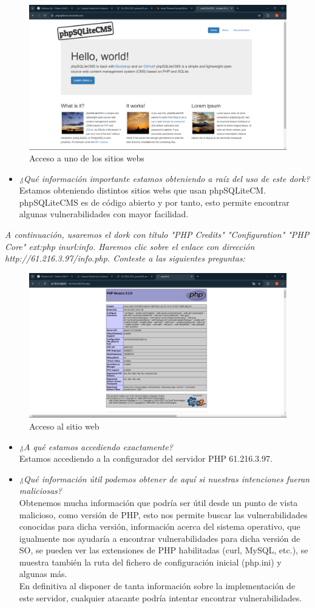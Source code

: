 \documentclass[12pt]{book}
\begin{document}
\begin{figure}[h]
    \centering
    \includegraphics[width=0.5\linewidth]{Practica 3y4/images/Captura de pantalla (83).png}
    \caption{Acceso a uno de los sitios webs}
    \label{fig:enter-label}
\end{figure}
\begin{itemize}
    \item\textit{¿Qué información importante estamos obteniendo a raíz del uso de este dork?}
    Estamos obteniendo distintos sitios webs que usan phpSQLiteCM. phpSQLiteCMS es de código abierto y por tanto, esto permite encontrar algunas vulnerabilidades con mayor facilidad.
\end{itemize}
\newpage
\textit{A continuación, usaremos el dork con título "PHP Credits" "Configuration" "PHP Core" ext:php inurl:info. Haremos clic sobre el enlace con dirección http://61.216.3.97/info.php.
Conteste a las siguientes preguntas:}
\begin{figure}[h]
    \centering
    \includegraphics[width=0.5\linewidth]{Practica 3y4/images/Captura de pantalla (84).png}
    \caption{Acceso al sitio web}
    \label{fig:enter-label}
\end{figure}
\begin{itemize}
    \item\textit{¿A qué estamos accediendo exactamente?}\\
    Estamos accediendo a la configurador del servidor PHP 61.216.3.97.
    \item\textit{¿Qué información útil podemos obtener de aquí si nuestras intenciones fueran maliciosas?}\\
    Obtenemos mucha información que podría ser útil desde un punto de vista malicioso, como versión de PHP, esto nos permite buscar las vulnerabilidades conocidas para dicha versión, información acerca del sistema operativo, que igualmente nos ayudaría a encontrar vulnerabilidades para dicha versión de SO, se pueden ver las extensiones de PHP habilitadas (curl, MySQL, etc.), se muestra también la ruta del fichero de configuración inicial (php.ini) y algunas más.\\
    En definitiva al disponer de tanta información sobre la implementación de este servidor, cualquier atacante podría intentar encontrar vulnerabilidades.
\end{itemize}
\end{document}
